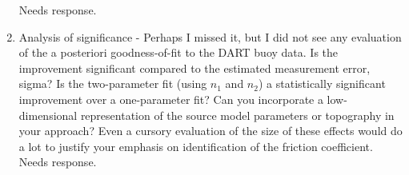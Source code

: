 \documentclass[]{article}
\newcommand{\alert}[1]{{\color{red} #1}}
\begin{document}
\begin{enumerate}
\alert{Needs response.} \\

\item Analysis of significance - Perhaps I missed it, but I did not see any evaluation of the a posteriori goodness-of-fit to the DART buoy data. Is the improvement significant compared to the estimated measurement error, sigma? Is the two-parameter fit (using $n_1$ and $n_2$) a statistically significant improvement over a one-parameter fit? Can you incorporate a low-dimensional representation of the source model parameters or topography in your approach? Even a cursory evaluation of the size of these effects would do a lot to justify your emphasis on identification of the friction coefficient.\\

\alert{Needs response.} \\

\end{enumerate}
\end{document}
